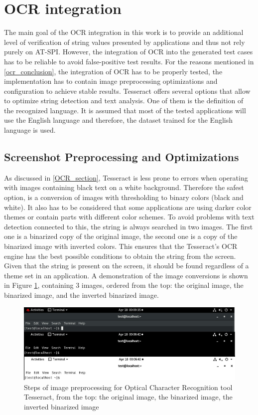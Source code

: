 \section{OCR integration}
The main goal of the OCR integration in this work is to provide an additional level of verification of string values presented by applications and thus not rely purely on AT-SPI. However, the integration of OCR into the generated test cases has to be reliable to avoid false-positive test results. For the reasons mentioned in \ref{ocr_conclusion}, the integration of OCR has to be properly tested, the implementation has to contain image preprocessing optimizations and configuration to achieve stable results. Tesseract offers several options that allow to optimize string detection and text analysis. One of them is the definition of the recognized language. It is assumed that most of the tested applications will use the English language and therefore, the dataset trained for the English language is used.

\subsection{Screenshot Preprocessing and Optimizations}
As discussed in \ref{OCR_section}, Tesseract is less prone to errors when operating with images containing black text on a white background. Therefore the safest option, is a conversion of images with thresholding to binary colors (black and white). It also has to be considered that some applications are using darker color themes or contain parts with different color schemes. To avoid problems with text detection connected to this, the string is always searched in two images. The first one is a binarized copy of the original image, the second one is a copy of the binarized image with inverted colors. This ensures that the Tesseract's OCR engine has the best possible conditions to obtain the string from the screen. Given that the string is present on the screen, it should be found regardless of a theme set in an application. A demonstration of the image conversions is shown in Figure \ref{ocr_conversion}, containing 3 images, ordered from the top: the original image, the binarized image, and the inverted binarized image. 

\begin{figure}[H]
	\centering
	\includegraphics[width=1\textwidth,clip]{obrazky-figures/OCR_conversion.jpg}
	\caption{Steps of image preprocessing for Optical Character Recognition tool Tesseract, from the top: the original image, the binarized image, the inverted binarized image}
	\label{ocr_conversion}
\end{figure}

